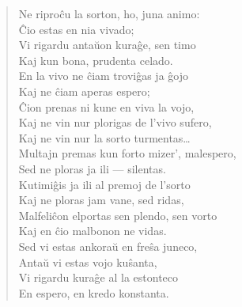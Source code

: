 \begin{verse}
                  \vin Ne ripro\^cu la sorton, ho, juna animo:\\
                  \^Cio estas en nia vivado;\\
                  Vi rigardu anta\u uon kura\^ge, sen timo\\
                  Kaj kun bona, prudenta celado.\\
                  En la vivo ne \^ciam trovi\^gas ja \^gojo\\
                  Kaj ne \^ciam aperas espero;\\
                  \^Cion prenas ni kune en viva la vojo,\\
                  Kaj ne vin nur plorigas de l'vivo sufero,\\
                  Kaj ne vin nur la sorto turmentas\dots\\
                  Multajn premas kun forto mizer', malespero,\\
                  Sed ne ploras ja ili --- silentas.\\
                  Kutimi\^gis ja ili al premoj de l'sorto\\
                  Kaj ne ploras jam vane, sed ridas,\\
                  Malfeli\^con elportas sen plendo, sen vorto\\
                  Kaj en \^cio malbonon ne vidas.\\
                  Sed vi estas ankora\u u en fre\^sa juneco,\\
                  Anta\u u vi estas vojo ku\^santa,\\
                  Vi rigardu kura\^ge al la estonteco\\
                  En espero, en kredo konstanta.

\end{verse}

\smallrule{}